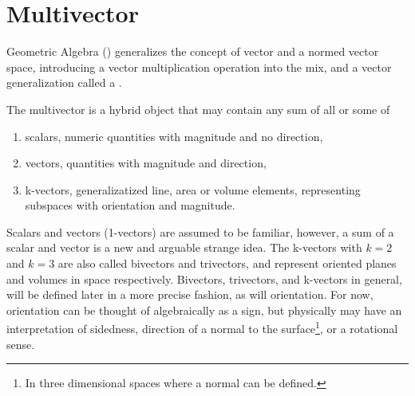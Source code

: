 \section{Multivector}
Geometric Algebra () generalizes the concept of vector and a normed vector space, introducing a vector multiplication operation into the mix, and a vector generalization called a .

The multivector is a hybrid object that may contain any sum of all or some of

\begin{enumerate}
   \item scalars, numeric quantities with magnitude and no direction,
   \item vectors, quantities with magnitude and direction,
   \item k-vectors, generalizatized line, area or volume elements, representing subspaces with orientation and magnitude.
\end{enumerate}

Scalars and vectors (1-vectors) are assumed to be familiar, however, a sum of a scalar and vector is a new and arguable strange idea.  The k-vectors with \( k=2 \) and \( k = 3 \) are also called bivectors and trivectors, and represent oriented planes and volumes in space respectively.
Bivectors, trivectors, and k-vectors in general, will be defined later in a more precise fashion, as will orientation.  For now, orientation can be thought of algebraically as a sign, but physically may have an interpretation of sidedness, direction of a normal to the surface\footnote{In three dimensional spaces where a normal can be defined.}, or a rotational sense.

